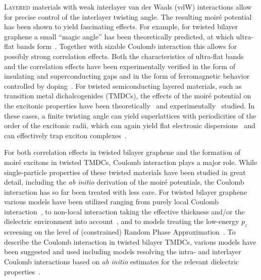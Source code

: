 \lettrine[lines=3]{L}{ayered} materials with weak interlayer van der Waals (vdW) interactions allow for precise control of the interlayer twisting angle. The resulting moir\'e potential has been shown to yield fascinating effects. For example, for twisted bilayer graphene a small ``magic angle'' has been theoretically predicted, at which ultra-flat bands form~\cite{suarez_morell_flat_2010,bistritzer_moire_2011}. Together with sizable Coulomb interaction this allows for possibly strong correlation effects. Both the characteristics of ultra-flat bands~\cite{li_observation_2010} and the correlation effects have been experimentally verified in the form of insulating and superconducting gaps and in the form of ferromagnetic behavior controlled by doping~\cite{cao_correlated_2018,cao_unconventional_2018,yankowitz_tuning_2019,sharpe_emergent_2019}. For twisted semiconducting layered materials, such as transition metal dichalcogenides (TMDCs), the effects of the moir\'e potential on the excitonic properties have been theoretically~\cite{wu_topological_2017,danovich_localized_2018,wu_hubbard_2018,brem_tunable_2020,choi_twist_2021} and experimentally~\cite{tran_evidence_2019,seyler_signatures_2019,zhang_twist-angle_2020} studied. In these cases, a finite twisting angle can yield superlattices with periodicities of the order of the excitonic radii, which can again yield flat electronic dispersions~\cite{li_imaging_2021,angeli__2021} and can effectively trap exciton complexes~\cite{seyler_signatures_2019,brem_tunable_2020}. 

For both correlation effects in twisted bilayer graphene and the formation of moir\'e excitons in twisted TMDCs, Coulomb interaction plays a major role. While single-particle properties of these twisted materials have been studied in great detail, including the \textit{ab initio} derivation of the moir\'e potentials, the Coulomb interaction has so far been treated with less care.  For twisted bilayer graphene various models have been utilized ranging from purely local Coulomb interaction~\cite{cao_correlated_2018}, to non-local interaction taking the effective thickness and/or the dielectric environment into account~\cite{goodwin_twist-angle_2019,cea_band_2020,bernevig_twisted_2021,liu_tuning_2021}, and to models treating the low-energy $p_z$ screening on the level of (constrained) Random Phase Approximation~\cite{pizarro_internal_2019,goodwin_attractive_2019}. To describe the Coulomb interaction in twisted bilayer TMDCs, various models have been suggested and used including models resolving the intra- and interlayer Coulomb interactions based on \textit{ab initio} estimates for the relevant dielectric properties~\cite{danovich_localized_2018,brem_tunable_2020,choi_twist_2021}.

